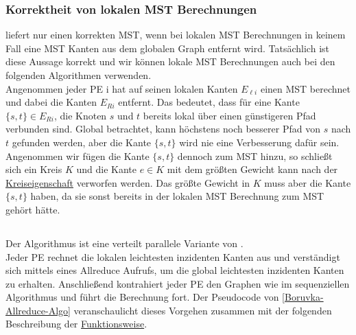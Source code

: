\subsubsection{Korrektheit von lokalen MST Berechnungen}\label{Korrektheit}
\mergeMST liefert nur einen korrekten MST, wenn bei lokalen MST Berechnungen in keinem Fall eine MST Kanten aus dem globalen Graph entfernt wird.
Tatsächlich ist diese Aussage korrekt und wir können lokale MST Berechnungen auch bei den folgenden Algorithmen verwenden. \\
Angenommen jeder PE i hat auf seinen lokalen Kanten $E_{\ell i}$ einen MST berechnet und dabei die Kanten $E_{Ri}$ entfernt. Das bedeutet, dass für eine Kante $\{s,t\} \in E_{Ri}$, die Knoten $s$ und $t$ bereits lokal über einen günstigeren Pfad verbunden sind. Global betrachtet, kann höchstens noch besserer Pfad von $s$ nach $t$ gefunden werden, aber die Kante $\{s,t\}$ wird nie eine Verbesserung dafür sein. Angenommen wir fügen die Kante $\{s,t\}$ dennoch zum MST hinzu, so schließt sich ein Kreis $K$ und die Kante $e \in K$  mit dem größten Gewicht kann nach der \hyperref[Kreiseigenschaft]{Kreiseigenschaft} verworfen werden. Das größte Gewicht in $K$ muss aber die Kante $\{s,t\}$ haben, da sie sonst bereits in der lokalen MST Berechnung zum MST gehört hätte.

\subsection{\boruvkaAllreduce}
Der \boruvkaAllreduce Algorithmus ist eine verteilt parallele Variante von \boruvkasAlgorithmus \cite{boruuvka1926jistem}. \\
Jeder PE rechnet die lokalen leichtesten inzidenten Kanten aus und verständigt sich mittels eines Allreduce Aufrufs, um die global leichtesten inzidenten Kanten zu erhalten. Anschließend kontrahiert jeder PE den Graphen wie im sequenziellen \boruvka Algorithmus und führt die Berechnung fort. Der Pseudocode von \cref{Boruvka-Allreduce-Algo} veranschaulicht dieses Vorgehen zusammen mit der folgenden Beschreibung der  \hyperref[Funktion-Borruvka]{Funktionsweise}.

